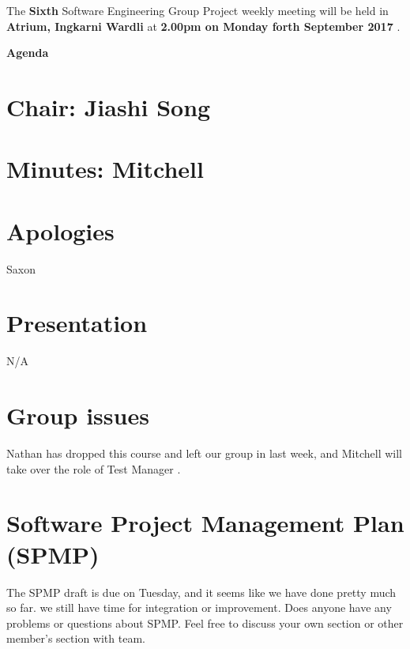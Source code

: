\documentclass[11pt, a4paper]{article}
\newcommand{\meetingno}{ Sixth }
\newcommand{\meetinglocation}{ Atrium, Ingkarni Wardli } %
\newcommand{\meetingdatetime}{ 2.00pm on Monday forth September 2017 } %
\newcommand{\meetingchair}{ Jiashi Song} %
\newcommand{\meetingminutes}{ Mitchell } %
\begin{document}
  \noindent The {\bf \meetingno} Software Engineering Group Project weekly meeting will be held in {\bf \meetinglocation } at {\bf \meetingdatetime }.

  \vspace*{15pt}

  \begin{center}
  \huge \bf Agenda
  \end{center}

  \section*{Chair: \meetingchair }
  \section*{Minutes: \meetingminutes }
  

  \vspace*{10pt}

  \section{Apologies}
  Saxon 

  \section{Presentation}

  N/A

  \section{ Group issues }
   Nathan has dropped this course and left our group in last week, and Mitchell will take over the role of Test Manager .

  \section{Software Project Management Plan (SPMP)}
   The SPMP draft is due on Tuesday, and it seems like we have done pretty much so far. we still have time for integration or improvement. Does anyone have any problems or questions about SPMP. Feel free to discuss your own section or other member's section with team.
   
\end{document}
